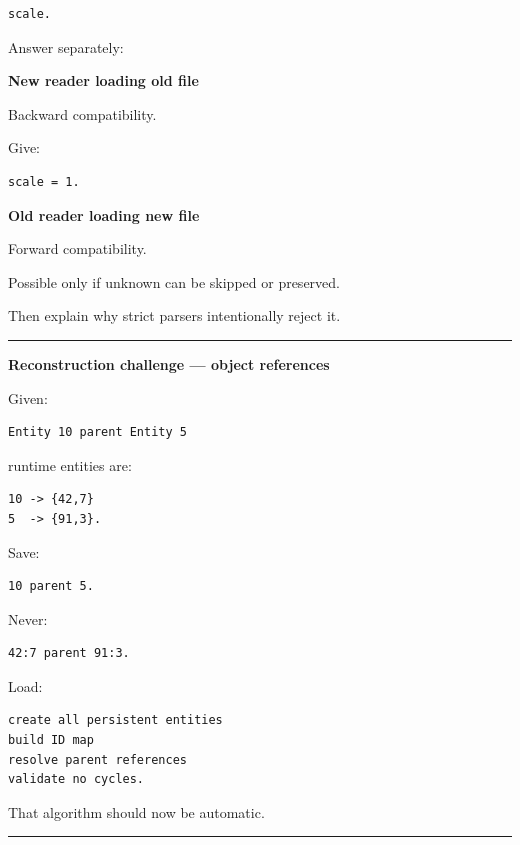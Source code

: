 \begin{verbatim}
scale.
\end{verbatim}

Answer separately:

\textbf{New reader loading old file}

Backward compatibility.

Give:

\begin{verbatim}
scale = 1.
\end{verbatim}

\textbf{Old reader loading new file}

Forward compatibility.

Possible only if unknown  can be skipped or preserved.

Then explain why strict parsers intentionally reject it.

\begin{center}\rule{0.5\linewidth}{0.5pt}\end{center}

\textbf{Reconstruction challenge --- object references}

Given:

\begin{verbatim}
Entity 10 parent Entity 5
\end{verbatim}

runtime entities are:

\begin{verbatim}
10 -> {42,7}
5  -> {91,3}.
\end{verbatim}

Save:

\begin{verbatim}
10 parent 5.
\end{verbatim}

Never:

\begin{verbatim}
42:7 parent 91:3.
\end{verbatim}

Load:

\begin{verbatim}
create all persistent entities
build ID map
resolve parent references
validate no cycles.
\end{verbatim}

That algorithm should now be automatic.

\begin{center}\rule{0.5\linewidth}{0.5pt}\end{center}

